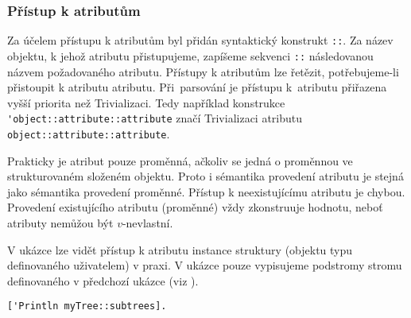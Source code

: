 \subsubsection{Přístup k atributům}

Za účelem přístupu k atributům byl přidán syntaktický konstrukt \lstinline{::}. Za název objektu,
k jehož atributu přistupujeme, zapíšeme sekvenci \lstinline{::} následovanou názvem požadovaného
atributu. Přístupy k atributům lze řetězit, potřebujeme-li přistoupit k atributu atributu.
Při~parsování je přístupu k~atributu přiřazena vyšší priorita než Trivializaci. Tedy například
konstrukce \lstinline{'object::attribute::attribute} značí Trivializaci atributu
\lstinline{object::attribute::attribute}.

Prakticky je atribut pouze proměnná, ačkoliv se jedná o proměnnou ve strukturovaném složeném
objektu. Proto i sémantika provedení atributu je stejná jako sémantika provedení proměnné. Přístup
k neexistujícímu atributu je chybou. Provedení existujícího atributu (proměnné) vždy zkonstruuje
hodnotu, neboť atributy nemůžou být $v$-nevlastní.

V ukázce  lze vidět přístup k atributu instance struktury (objektu
typu definovaného uživatelem) v praxi. V ukázce pouze vypisujeme podstromy stromu definovaného
v předchozí ukázce (viz ).

\begin{lstlisting}[caption={Příklad přístupu k atributům objektu},label=struct-attr-access]
['Println myTree::subtrees].
\end{lstlisting}

\endinput
